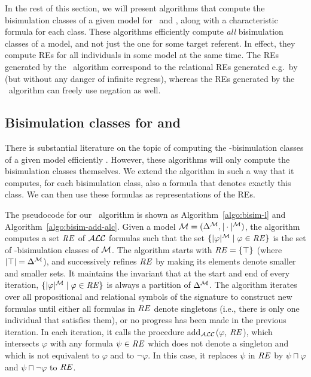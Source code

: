 In the rest of this section, we will present algorithms that compute
the bisimulation classes of a given model for \alc\ and \el, along
with a characteristic formula for each class.  These algorithms
efficiently compute \emph{all} bisimulation classes of a model, and
not just the one for some target referent.  In effect, they compute
REs for all individuals in some model at the same time.  The REs
generated by the \el\ algorithm correspond to the relational REs
generated e.g.\ by 
(but without any danger of infinite regress), whereas the REs
generated by the \alc\ algorithm can freely use negation as well.



\subsection{Bisimulation classes for \alc and \el}

There is substantial literature on the topic of computing the
\alc-bisimulation classes of a given model efficiently
\cite{hopc:algo71,paig:thre87,dovier04:_effic_algor_for_comput_bisim_equiv}.
However, these algorithms will only compute the bisimulation classes
themselves. We extend the  algorithm in such a
way that it computes, for each bisimulation class, also a formula that
denotes exactly this class.  We can then use these formulas as
representations of the REs.

The pseudocode for our \alc\ algorithm is shown as
Algorithm~\ref{algo:bisim-l} and Algorithm~\ref{algo:bisim-add-alc}.
Given a model $\mathcal{M}=(\Delta^{\mathcal{M}}, |\cdot|^{\mathcal{M}})$, the algorithm computes
a set $\mathit{RE}$ of $\mathcal{ALC}$ formulas such that the set $\{|\varphi|^{\mathcal{M}} \mid
\varphi \in \mathit{RE}\}$ is the set of \alc-bisimulation classes of $\mathcal{M}$.
The algorithm starts with $\mathit{RE} = \{\top\}$ (where $|\top| =
\Delta^{\mathcal{M}}$), and successively refines $\mathit{RE}$ by making its elements
denote smaller and smaller sets.  It maintains the invariant that at
the start and end of every iteration, $\{|\varphi|^{\mathcal{M}} \mid \varphi
\in \mathit{RE}\}$ is always a partition of $\Delta^{\mathcal{M}}$.  The algorithm
iterates over all propositional and relational symbols of the
signature to construct new formulas until either all formulas in $\mathit{RE}$
denote singletons (i.e., there is only one individual that satisfies
them), or no progress has been made in the previous iteration.  In
each iteration, it calls the procedure add$_\mathcal{ALC}$($\varphi$, $\mathit{RE}$),
which intersects $\varphi$ with any formula $\psi \in \mathit{RE}$ which does
not denote a singleton and which is not equivalent to $\varphi$ and to
$\neg \varphi$. In this case, it replaces $\psi$ in $\mathit{RE}$ by $\psi
\sqcap \varphi$ and $\psi \sqcap \neg \varphi$ to $\mathit{RE}$.


